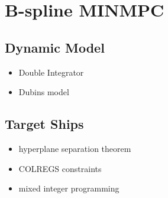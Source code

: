 
\chapter{B-spline MINMPC}\label{chap:b-spline-minmpc}

\section{Dynamic Model}
\begin{itemize}
    \item Double Integrator
    \item Dubins model
\end{itemize}

\section{Target Ships}
\begin{itemize}
    \item hyperplane separation theorem
    \item COLREGS constraints
    \item mixed integer programming
\end{itemize}